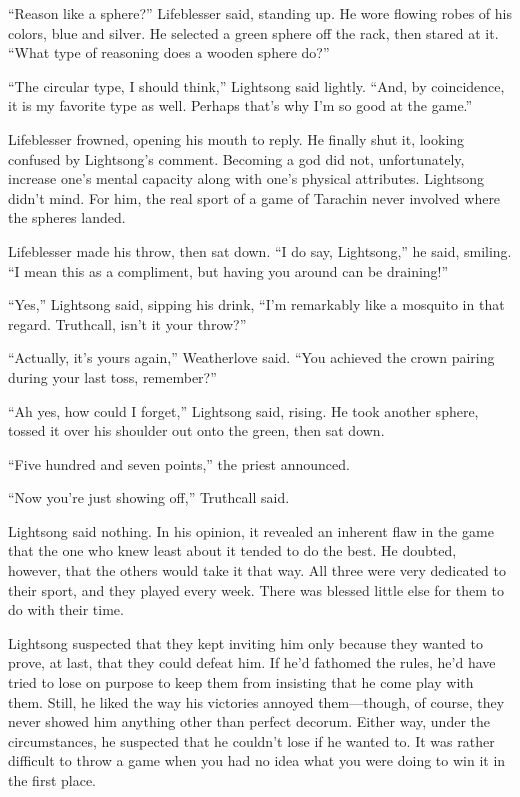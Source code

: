 “Reason like a sphere?” Lifeblesser said, standing up. He wore flowing robes of his colors, blue and silver. He selected a green sphere off the rack, then stared at it. “What type of reasoning does a wooden sphere do?”

“The circular type, I should think,” Lightsong said lightly. “And, by coincidence, it is my favorite type as well. Perhaps that’s why I’m so good at the game.”

Lifeblesser frowned, opening his mouth to reply. He finally shut it, looking confused by Lightsong’s comment. Becoming a god did not, unfortunately, increase one’s mental capacity along with one’s physical attributes. Lightsong didn’t mind. For him, the real sport of a game of Tarachin never involved where the spheres landed.

Lifeblesser made his throw, then sat down. “I do say, Lightsong,” he said, smiling. “I mean this as a compliment, but having you around can be draining!”

“Yes,” Lightsong said, sipping his drink, “I’m remarkably like a mosquito in that regard. Truthcall, isn’t it your throw?”

“Actually, it’s yours again,” Weatherlove said. “You achieved the crown pairing during your last toss, remember?”

“Ah yes, how could I forget,” Lightsong said, rising. He took another sphere, tossed it over his shoulder out onto the green, then sat down.

“Five hundred and seven points,” the priest announced.

“Now you’re just showing off,” Truthcall said.

Lightsong said nothing. In his opinion, it revealed an inherent flaw in the game that the one who knew least about it tended to do the best. He doubted, however, that the others would take it that way. All three were very dedicated to their sport, and they played every week. There was blessed little else for them to do with their time.

Lightsong suspected that they kept inviting him only because they wanted to prove, at last, that they could defeat him. If he’d fathomed the rules, he’d have tried to lose on purpose to keep them from insisting that he come play with them. Still, he liked the way his victories annoyed them—though, of course, they never showed him anything other than perfect decorum. Either way, under the circumstances, he suspected that he couldn’t lose if he wanted to. It was rather difficult to throw a game when you had no idea what you were doing to win it in the first place.

